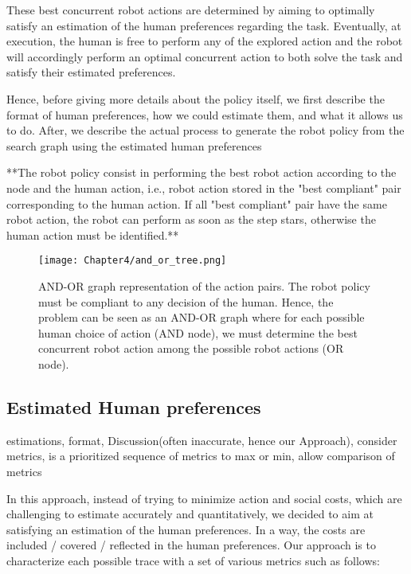 These best concurrent robot actions are determined by aiming to optimally satisfy an estimation of the human preferences regarding the task. Eventually, at execution, the human is free to perform any of the explored action and the robot will accordingly perform an optimal concurrent action to both solve the task and satisfy their estimated preferences.

Hence, before giving more details about the policy itself, we first describe the format of human preferences, how we could estimate them, and what it allows us to do. After, we describe the actual process to generate the robot policy from the search graph using the estimated human preferences


**The robot policy consist in performing the best robot action according to the node and the human action, i.e., robot action stored in the "best compliant" pair corresponding to the human action.
If all "best compliant" pair have the same robot action, the robot can perform as soon as the step stars, otherwise the human action must be identified.**

\begin{figure}
    \texttt{[image: Chapter4/and\_or\_tree.png]}
    \caption{AND-OR graph representation of the action pairs. 
    The robot policy must be compliant to any decision of the human. Hence, the problem can be seen as an AND-OR graph where for each possible human choice of action (AND node), we must determine the best concurrent robot action among the possible robot actions (OR node).
    }
    \label{fig:and_or}
\end{figure}


    \subsection{Estimated Human preferences}
estimations, format, Discussion(often inaccurate, hence our Approach), consider metrics, is a prioritized sequence of metrics to max or min, allow comparison of metrics

In this approach, instead of trying to minimize action and social costs, which are challenging to estimate accurately and quantitatively, we decided to aim at satisfying an estimation of the human preferences. In a way, the costs are included / covered / reflected in the human preferences. Our approach is to characterize each possible trace with a set of various metrics such as follows:

